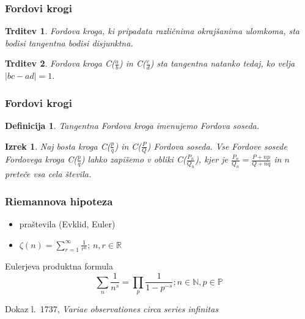 \documentclass{beamer}
\newtheorem{izrek}{Izrek}
\newtheorem{definicija}{Definicija}
\newtheorem{trditev}{Trditev}
\begin{document}

\begin{frame}
\frametitle{Fordovi krogi}

\begin{trditev}
\label{trd:FordDisjTang}
Fordova kroga, ki pripadata različnima okrajšanima ulomkoma, sta bodisi tangentna bodisi disjunktna.
\end{trditev}

\pause
\begin{trditev}
\label{trd:FordTangentnost}
Fordova kroga C($\frac{a}{b}$) in C($\frac{c}{d}$) sta tangentna natanko tedaj, ko velja \( |bc-ad|=1. \)
\end{trditev}

\end{frame}


\begin{frame}
\frametitle{Fordovi krogi}

\begin{definicija}
Tangentna Fordova kroga imenujemo \emph{Fordova soseda}.
\end{definicija}

\pause
\begin{izrek}
Naj bosta kroga C($\frac{p}{q}$) in C($\frac{P}{Q}$) Fordova soseda. Vse Fordove sosede Fordovega kroga C($\frac{p}{q}$) lahko zapišemo v obliki C($\frac{P_n}{Q_n}$), kjer je $\frac{P_n}{Q_n} = \frac{P+np}{Q+nq}$ in $n$ preteče vsa cela števila.
\end{izrek}

\end{frame}


\begin{frame}
\frametitle{Riemannova hipoteza}

\begin{itemize}
\pause
\item praštevila (Evklid, Euler)
%
\pause
\item $ \zeta(n) = \sum_{r=1}^{\infty}\frac{1}{r^n} $;  $n,r\in\mathbb{R}$
\end{itemize}

\pause
\begin{block}{Eulerjeva produktna formula}
\[ \sum_{n}\frac{1}{n^s} = \prod_{p}\frac{1}{1-p^{-s}}; n\in\mathbb{N}, p\in\mathbb{P} \]
\end{block}

Dokaz l.~1737, \emph{Variae observationes circa series infinitas}

\end{frame}
\end{document}
